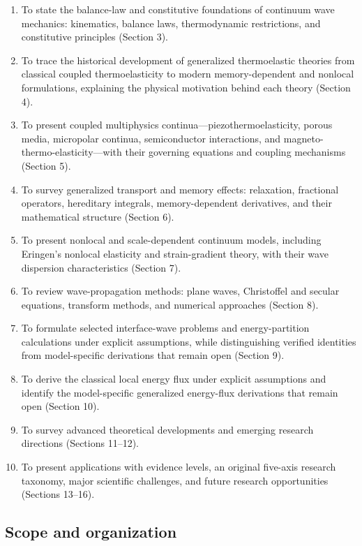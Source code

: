 \begin{enumerate}
\item To state the balance-law and constitutive foundations of continuum wave mechanics: kinematics, balance laws, thermodynamic restrictions, and constitutive principles (Section 3).
\item To trace the historical development of generalized thermoelastic theories from classical coupled thermoelasticity to modern memory-dependent and nonlocal formulations, explaining the physical motivation behind each theory (Section 4).
\item To present coupled multiphysics continua—piezothermoelasticity, porous media, micropolar continua, semiconductor interactions, and magneto-thermo-elasticity—with their governing equations and coupling mechanisms (Section 5).
\item To survey generalized transport and memory effects: relaxation, fractional operators, hereditary integrals, memory-dependent derivatives, and their mathematical structure (Section 6).
\item To present nonlocal and scale-dependent continuum models, including Eringen's nonlocal elasticity and strain-gradient theory, with their wave dispersion characteristics (Section 7).
\item To review wave-propagation methods: plane waves, Christoffel and secular equations, transform methods, and numerical approaches (Section 8).
\item To formulate selected interface-wave problems and energy-partition calculations under explicit assumptions, while distinguishing verified identities from model-specific derivations that remain open (Section 9).
\item To derive the classical local energy flux under explicit assumptions and identify the model-specific generalized energy-flux derivations that remain open (Section 10).
\item To survey advanced theoretical developments and emerging research directions (Sections 11--12).
\item To present applications with evidence levels, an original five-axis research taxonomy, major scientific challenges, and future research opportunities (Sections 13--16).
\end{enumerate}

\subsection{Scope and organization}

